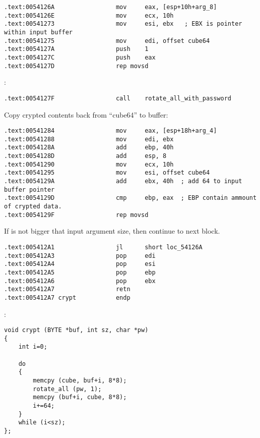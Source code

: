 \begin{lstlisting}
.text:0054126A                 mov     eax, [esp+10h+arg_8]
.text:0054126E                 mov     ecx, 10h
.text:00541273                 mov     esi, ebx   ; EBX is pointer within input buffer
.text:00541275                 mov     edi, offset cube64
.text:0054127A                 push    1
.text:0054127C                 push    eax
.text:0054127D                 rep movsd
\end{lstlisting}

 :

\begin{lstlisting}
.text:0054127F                 call    rotate_all_with_password
\end{lstlisting}

{Copy crypted contents back from ``cube64'' to buffer}:

\begin{lstlisting}
.text:00541284                 mov     eax, [esp+18h+arg_4]
.text:00541288                 mov     edi, ebx
.text:0054128A                 add     ebp, 40h
.text:0054128D                 add     esp, 8
.text:00541290                 mov     ecx, 10h
.text:00541295                 mov     esi, offset cube64
.text:0054129A                 add     ebx, 40h  ; add 64 to input buffer pointer
.text:0054129D                 cmp     ebp, eax  ; EBP contain ammount of crypted data.
.text:0054129F                 rep movsd
\end{lstlisting}

{If \EBP is not bigger that input argument size, then continue to next block.}

\begin{lstlisting}
.text:005412A1                 jl      short loc_54126A
.text:005412A3                 pop     edi
.text:005412A4                 pop     esi
.text:005412A5                 pop     ebp
.text:005412A6                 pop     ebx
.text:005412A7                 retn
.text:005412A7 crypt           endp
\end{lstlisting}

:

\begin{lstlisting}
void crypt (BYTE *buf, int sz, char *pw)
{
	int i=0;
	
	do
	{
		memcpy (cube, buf+i, 8*8);
		rotate_all (pw, 1);
		memcpy (buf+i, cube, 8*8);
		i+=64;
	}
	while (i<sz);
};
\end{lstlisting}

